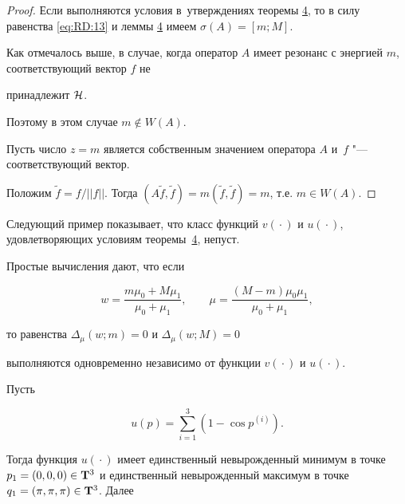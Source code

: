 \smallskip



\begin{proof} Если выполняются условия в~утверждениях теоремы \hyperlink{RD:th4}{4}, то в силу равенства \eqref{eq:RD:13} и леммы \hyperlink{RD:lemma4}{4} имеем $\sigma(A)=[m; M]$. 

Как отмечалось выше, в случае, когда оператор $A$ имеет резонанс с энергией $m$, соответствующий вектор $f$ не

принадлежит ${\cal H}$. 

Поэтому в этом случае $m \not\in W(A)$. 

Пусть число $z=m$ является собственным значением оператора $A$ и~$f$ "--- соответствующий вектор. 

Положим $\widetilde{f}=f/||f||$. Тогда $(A\widetilde{f},

\widetilde{f})=m(\widetilde{f},\widetilde{f})=m$, т.е. $m \in

W(A)$. 

\end{proof}



\smallskip



Следующий пример показывает, что класс функций $v({}\cdot{})$ и $u({}\cdot{})$, удовлетворяющих условиям теоремы~\hyperlink{RD:th4}{4}, непуст. 

Простые вычисления дают, что если

$$

w=\frac{m \mu_0+M \mu_1}{\mu_0+\mu_1}, \qquad

\mu=\frac{(M-m)\mu_0\mu_1}{\mu_0+\mu_1},

$$

то равенства $\Delta_\mu(w; m)=0$ и $\Delta_\mu(w; M)=0$

выполняются одновременно независимо от функции $v({}\cdot{})$ и $u({}\cdot{})$. 

Пусть 

$$u(p)=\sum\limits_{i=1}^3(1-\cos p^{(i)}).$$

Тогда функция $u({}\cdot{})$ имеет единственный невырожденный минимум в точке $p_1=(0, 0, 0) \in {\bf T}^3$ и единственный невырожденный максимум в точке $q_1=(\pi,\pi,\pi) \in {\bf T}^3$. Далее

